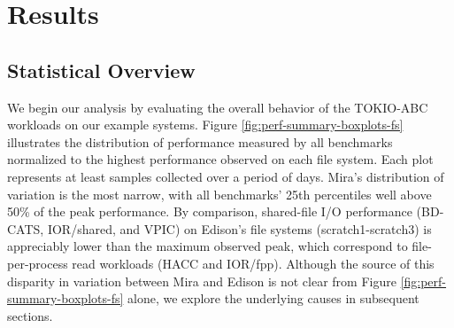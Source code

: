 \section{Results} \label{sec:results}


\subsection{Statistical Overview} \label{sec:results/overview}

We begin our analysis by evaluating the overall behavior of the TOKIO-ABC workloads
on our example systems.
Figure \ref{fig:perf-summary-boxplots-fs} illustrates the distribution of
performance measured by all benchmarks normalized to the highest performance
observed on each file system.
Each plot represents at least 
samples collected over a period of  days.
Mira's distribution of variation is the most narrow, with all benchmarks' 25th percentiles well above 50\% of the peak performance.
By comparison, shared-file I/O performance (BD-CATS, IOR/shared, and VPIC) on Edison's file systems (scratch1-scratch3) is appreciably lower than the maximum observed peak, which correspond to file-per-process read workloads (HACC and IOR/fpp).
Although the source of this disparity in variation between Mira and Edison is not clear from Figure \ref{fig:perf-summary-boxplots-fs} alone, we explore the underlying causes in subsequent sections.

